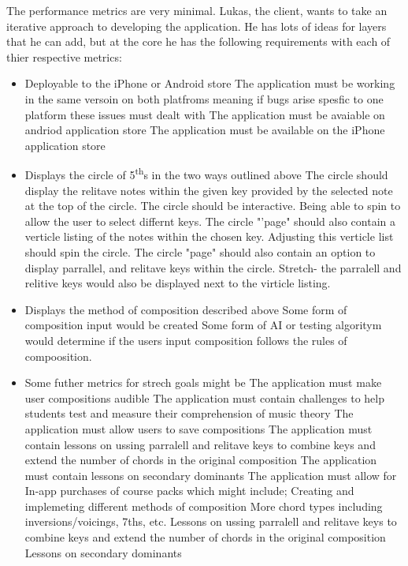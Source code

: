 \documentclass[onecolumn, draftclsnofoot,10pt, compsoc]{IEEEtran}
\begin{document}
    The performance metrics are very minimal.
    Lukas, the client, wants to take an iterative approach to developing the application.
    He has lots of ideas for layers that he can add, but at the core he has the following requirements with each of thier respective metrics:
    \begin{itemize}
    \item Deployable to the iPhone or Android store
	\subitem The application must be working in the same versoin on both platfroms meaning if bugs arise spesfic to one platform these issues must dealt with
	\subitem The application must be avaiable on andriod application store
	\subitem The application must be available on the iPhone application store 
    \item Displays the circle of 5\textsuperscript{th}s in the two ways outlined above
	\subitem The circle should display the relitave notes within the given key provided by the selected note at the top of the circle.
	\subitem The circle should be interactive. Being able to spin to allow the user to select differnt keys.
	\subitem The circle "'page" should also contain a verticle listing of the notes within the chosen key.
	\subitem Adjusting this verticle list should spin the circle.
	\subitem The circle "page" should also contain an option to display parrallel, and relitave keys within the circle.
		\subitem Stretch- the parralell and relitive keys would also be displayed next to the virticle listing.
    \item Displays the method of composition described above
	\subitem Some form of composition input would be created
	\subitem Some form of AI or testing algoritym would determine if the users input composition follows the rules of compoosition.
   \item Some futher metrics for strech goals might be
	\subitem The application must make user compositions audible
	\subitem The application must contain challenges to help students test and measure their comprehension of music theory
    	\subitem The application must allow users to save compositions
    	\subitem The application must contain lessons on ussing parralell and relitave keys to combine keys and extend the number of chords in the original composition
    	\subitem The application must contain lessons on secondary dominants
	\subitem The application must allow for In-app purchases of course packs which might include;
		\subitem Creating and implemeting different methods of composition
		\subitem More chord types including inversions/voicings, 7ths, etc.
		\subitem Lessons on ussing parralell and relitave keys to combine keys and extend the number of chords in the original composition
    		\subitem Lessons on secondary dominants

    \end {itemize}
    
    \par
    
    
\end{document}
